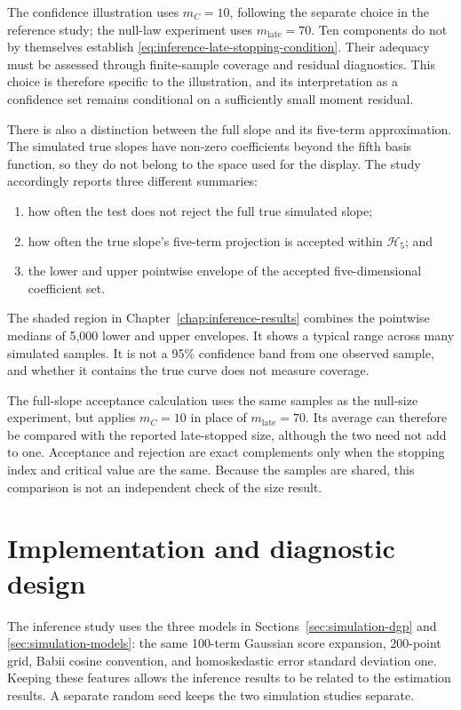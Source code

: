 The confidence illustration uses $m_C=10$, following the separate choice in
the reference study; the null-law experiment uses
$m_{\mathrm{late}}=70$.  Ten components do not by themselves establish
\eqref{eq:inference-late-stopping-condition}.  Their adequacy must be assessed
through finite-sample coverage and residual diagnostics.  This choice is
therefore specific to the illustration, and its interpretation as a
confidence set remains conditional on a sufficiently small moment residual.

There is also a distinction between the full slope and its five-term
approximation.  The simulated true slopes have non-zero coefficients beyond
the fifth basis function, so they do not belong to the space used for the
display.  The study accordingly reports three different summaries:
\begin{enumerate}
    \item how often the test does not reject the full true simulated slope;
    \item how often the true slope's five-term projection is accepted within
          $\mathcal H_5$; and
    \item the lower and upper pointwise envelope of the accepted
          five-dimensional coefficient set.
\end{enumerate}
The shaded region in Chapter~\ref{chap:inference-results} combines the
pointwise medians of 5,000 lower and upper envelopes.  It shows a typical
range across many simulated samples.  It is not a 95\% confidence band from
one observed sample, and whether it contains the true curve does not measure
coverage.

The full-slope acceptance calculation uses the same samples as the null-size
experiment, but applies $m_C=10$ in place of $m_{\mathrm{late}}=70$.  Its
average can therefore be compared with the reported late-stopped size,
although the two need not add to one.  Acceptance and rejection are exact
complements only when the stopping index and critical value are the same.
Because the samples are shared, this comparison is not an independent check
of the size result.

\section{Implementation and diagnostic design}
\label{sec:inference-implementation}

The inference study uses the three models in
Sections~\ref{sec:simulation-dgp} and \ref{sec:simulation-models}: the same
100-term Gaussian score expansion, 200-point grid, Babii cosine convention,
and homoskedastic error standard deviation one.  Keeping these features
allows the inference results to be related to the estimation results.  A
separate random seed keeps the two simulation studies separate.

